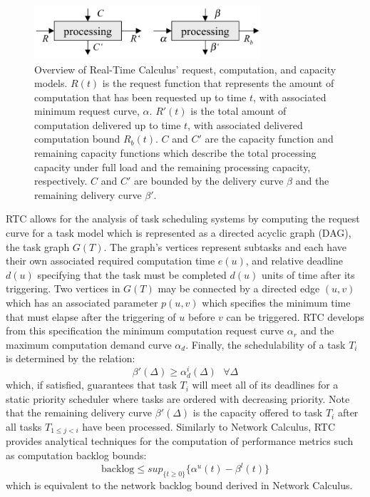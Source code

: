 \begin{figure}[htb]
	\centering
	\includegraphics[width=0.75\textwidth]{figs/rtc_overview.png}
	\caption{Overview of Real-Time Calculus' request, computation, and capacity models.  $R(t)$ is the request function that represents the amount of computation that has been requested up to time $t$, with associated minimum request curve, $\alpha$.  $R'(t)$ is the total amount of computation delivered up to time $t$, with associated delivered computation bound $R_b(t)$.  $C$ and $C'$ are the capacity function and remaining capacity functions which describe the total processing capacity under full load and the remaining processing capacity, respectively.  $C$ and $C'$ are bounded by the delivery curve $\beta$ and the remaining delivery curve $\beta'$.}
	\label{fig:rtc_overview}
\end{figure}

RTC allows for the analysis of task scheduling systems by computing the request curve for a task model which is represented as a directed acyclic graph (DAG), the task graph $G(T)$.  The graph's vertices represent subtasks and each have their own associated required computation time $e(u)$, and relative deadline $d(u)$ specifying that the task must be completed $d(u)$ units of time after its triggering.  Two vertices in $G(T)$ may be connected by a directed edge $(u,v)$ which has an associated parameter $p(u,v)$ which specifies the minimum time that must elapse after the triggering of $u$ before $v$ can be triggered.  RTC develops from this specification the minimum computation request curve $\alpha_r$ and the maximum computation demand curve $\alpha_d$.  Finally, the schedulability of a task $T_i$ is determined by the relation:
\begin{equation}
\beta'(\Delta)\geq\alpha^i_d(\Delta)\ \ \ \forall\Delta
\end{equation}
which, if satisfied, guarantees that task $T_i$ will meet all of its deadlines for a static priority scheduler where tasks are ordered with decreasing priority.  Note that the remaining delivery curve $\beta'(\Delta)$ is the capacity offered to task $T_i$ after all tasks $T_{1\leq j<i}$ have been processed. Similarly to Network Calculus, RTC provides analytical techniques for the computation of performance metrics such as computation backlog bounds:
\begin{equation}
\text{backlog}\leq sup_{\{t\geq 0\}}\{\alpha^u(t)-\beta^l(t)\}
\end{equation}
which is equivalent to the network backlog bound derived in Network Calculus.  

